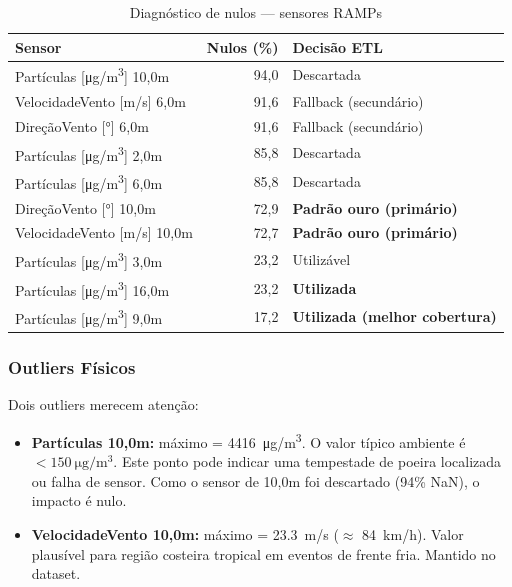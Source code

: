 \documentclass[12pt, a4paper]{article}
\begin{document}
\begin{table}[H]
\centering
\caption{Diagnóstico de nulos — sensores RAMPs}
\label{tab:ramps_nulos}
\begin{tabular}{@{}lrl@{}}
\toprule
\textbf{Sensor} & \textbf{Nulos (\%)} & \textbf{Decisão ETL} \\
\midrule
Partículas [\si{\micro\gram/\metre^3}] 10,0m & 94,0 & Descartada \\
VelocidadeVento [\si{\metre/\second}] 6,0m   & 91,6 & Fallback (secundário) \\
DireçãoVento [\si{\degree}] 6,0m              & 91,6 & Fallback (secundário) \\
Partículas [\si{\micro\gram/\metre^3}] 2,0m   & 85,8 & Descartada \\
Partículas [\si{\micro\gram/\metre^3}] 6,0m   & 85,8 & Descartada \\
DireçãoVento [\si{\degree}] 10,0m             & 72,9 & \textbf{Padrão ouro (primário)} \\
VelocidadeVento [\si{\metre/\second}] 10,0m   & 72,7 & \textbf{Padrão ouro (primário)} \\
Partículas [\si{\micro\gram/\metre^3}] 3,0m   & 23,2 & Utilizável \\
Partículas [\si{\micro\gram/\metre^3}] 16,0m  & 23,2 & \textbf{Utilizada} \\
Partículas [\si{\micro\gram/\metre^3}] 9,0m   & 17,2 & \textbf{Utilizada (melhor cobertura)} \\
\bottomrule
\end{tabular}
\end{table}

\subsubsection{Outliers Físicos}

Dois outliers merecem atenção:

\begin{itemize}
    \item \textbf{Partículas 10,0m:} máximo = \SI{4416}{\micro\gram/\metre^3}.
          O valor típico ambiente é $< \SI{150}{\micro\gram/\metre^3}$. Este
          ponto pode indicar uma tempestade de poeira localizada ou falha de
          sensor. Como o sensor de 10,0m foi descartado (94\% NaN), o impacto
          é nulo.
    \item \textbf{VelocidadeVento 10,0m:} máximo = \SI{23,3}{\metre/\second}
          ($\approx$ \SI{84}{\kilo\metre/\hour}). Valor plausível para região
          costeira tropical em eventos de frente fria. Mantido no dataset.
\end{itemize}
\end{document}
